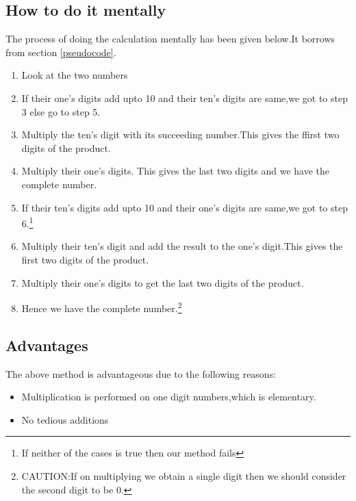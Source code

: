 \documentclass{article}
\begin{document}
\subsection{How to do it mentally}
The process of doing the calculation mentally has been given below.It borrows from section \ref{pseudocode}.
\begin{enumerate}
\item Look at the two numbers
\item If their one's digits add upto 10 and their ten's digits are same,we got to step 3 else go to step 5.
\item Multiply the ten's digit with its succeeding number.This gives the ffirst two digits of the product.
\item Multiply their one's digits. This gives the last two digits and we have the complete number.
\item If their ten's digits add upto 10 and their one's digits are same,we got to step 6.\footnote{If neither of the cases is true then our method fails}
\item Multiply their ten's digit and add the result to the one's digit.This gives the first two digits of the product.
\item Multiply their one's digits to get the last two digits of the product.
\item Hence we have the complete number.\footnote{CAUTION:If on multiplying we obtain a single digit then we should consider the second digit to be 0.}
\end{enumerate}

\subsection{Advantages}
The above method is advantageous due to the following reasons:
\begin{itemize}
\item Multiplication is performed on one digit numbers,which is elementary.
\item No tedious additions
\end{itemize}
\end{document}
